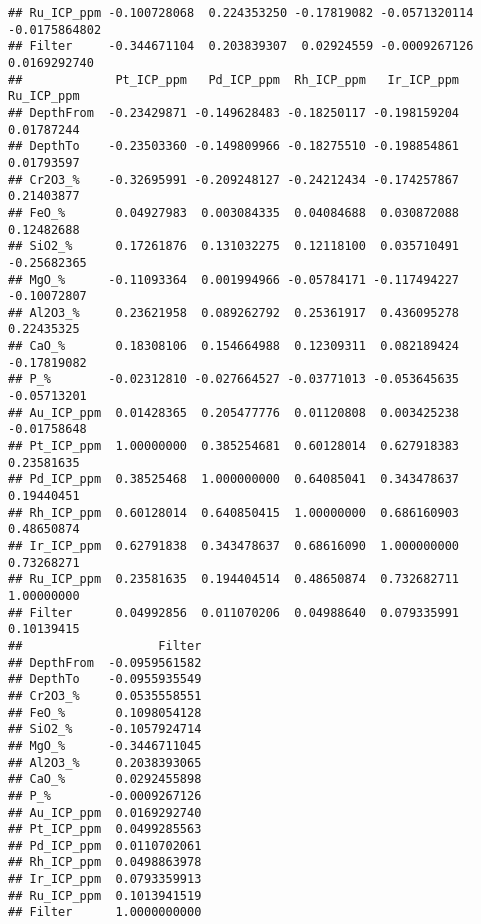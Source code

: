 \documentclass[
]{article}
\begin{document}
\begin{verbatim}
## Ru_ICP_ppm -0.100728068  0.224353250 -0.17819082 -0.0571320114 -0.0175864802
## Filter     -0.344671104  0.203839307  0.02924559 -0.0009267126  0.0169292740
##             Pt_ICP_ppm   Pd_ICP_ppm  Rh_ICP_ppm   Ir_ICP_ppm  Ru_ICP_ppm
## DepthFrom  -0.23429871 -0.149628483 -0.18250117 -0.198159204  0.01787244
## DepthTo    -0.23503360 -0.149809966 -0.18275510 -0.198854861  0.01793597
## Cr2O3_%    -0.32695991 -0.209248127 -0.24212434 -0.174257867  0.21403877
## FeO_%       0.04927983  0.003084335  0.04084688  0.030872088  0.12482688
## SiO2_%      0.17261876  0.131032275  0.12118100  0.035710491 -0.25682365
## MgO_%      -0.11093364  0.001994966 -0.05784171 -0.117494227 -0.10072807
## Al2O3_%     0.23621958  0.089262792  0.25361917  0.436095278  0.22435325
## CaO_%       0.18308106  0.154664988  0.12309311  0.082189424 -0.17819082
## P_%        -0.02312810 -0.027664527 -0.03771013 -0.053645635 -0.05713201
## Au_ICP_ppm  0.01428365  0.205477776  0.01120808  0.003425238 -0.01758648
## Pt_ICP_ppm  1.00000000  0.385254681  0.60128014  0.627918383  0.23581635
## Pd_ICP_ppm  0.38525468  1.000000000  0.64085041  0.343478637  0.19440451
## Rh_ICP_ppm  0.60128014  0.640850415  1.00000000  0.686160903  0.48650874
## Ir_ICP_ppm  0.62791838  0.343478637  0.68616090  1.000000000  0.73268271
## Ru_ICP_ppm  0.23581635  0.194404514  0.48650874  0.732682711  1.00000000
## Filter      0.04992856  0.011070206  0.04988640  0.079335991  0.10139415
##                   Filter
## DepthFrom  -0.0959561582
## DepthTo    -0.0955935549
## Cr2O3_%     0.0535558551
## FeO_%       0.1098054128
## SiO2_%     -0.1057924714
## MgO_%      -0.3446711045
## Al2O3_%     0.2038393065
## CaO_%       0.0292455898
## P_%        -0.0009267126
## Au_ICP_ppm  0.0169292740
## Pt_ICP_ppm  0.0499285563
## Pd_ICP_ppm  0.0110702061
## Rh_ICP_ppm  0.0498863978
## Ir_ICP_ppm  0.0793359913
## Ru_ICP_ppm  0.1013941519
## Filter      1.0000000000
\end{verbatim}
\end{document}
